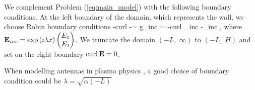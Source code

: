 We complement Problem (\ref{eq:main_model}) with the following boundary conditions.
At the left boundary of the domain, which represents the wall, we choose Robin boundary conditions 
\be
-curl \E -\imath \lambda\E \wedge \n = g_{inc} = -curl \E_{inc} -\imath\lambda\E_{inc} \wedge \n,
\ee
where ${\bf E}_{inc} = \exp \left(\imath \lambda x\right)\begin{pmatrix} E_1\\ E_2 \end{pmatrix}$. We truncate the domain 
$(-L,\; \infty)$ to $(-L,\; H)$ and set on the right boundary $\operatorname{curl} {\bf E} = 0$. 
\begin{remark}
	When modelling antennas in plasma physics , 
	a good choice of boundary condition could be $\lambda = \sqrt{\alpha(-L)}$
\end{remark}

